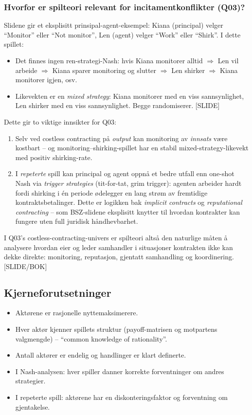 \subsubsection*{Hvorfor er spilteori relevant for incitamentkonflikter (Q03)?}

Slidene gir et eksplisitt prinsipal-agent-eksempel: Kiana (principal) velger ``Monitor'' eller ``Not monitor'', Len (agent) velger ``Work'' eller ``Shirk''. I dette spillet:
\begin{itemize}
\item Det finnes ingen ren-strategi-Nash: hvis Kiana monitorer alltid $\Rightarrow$ Len vil arbeide $\Rightarrow$ Kiana sparer monitoring og slutter $\Rightarrow$ Len shirker $\Rightarrow$ Kiana monitorer igjen, osv.
\item Likevekten er en \emph{mixed strategy}: Kiana monitorer med en viss sannsynlighet, Len shirker med en viss sannsynlighet. Begge randomiserer. [SLIDE]
\end{itemize}
Dette gir to viktige innsikter for Q03:
\begin{enumerate}
\item Selv ved costless contracting på \emph{output} kan monitoring av \emph{innsats} være kostbart -- og monitoring--shirking-spillet har en stabil mixed-strategy-likevekt med positiv shirking-rate.
\item I \emph{repeterte} spill kan principal og agent oppnå et bedre utfall enn one-shot Nash via \emph{trigger strategies} (tit-for-tat, grim trigger): agenten arbeider hardt fordi shirking i én periode ødelegger en lang strøm av fremtidige kontraktsbetalinger. Dette er logikken bak \emph{implicit contracts} og \emph{reputational contracting} -- som BSZ-slidene eksplisitt knytter til hvordan kontrakter kan fungere uten full juridisk håndhevbarhet.
\end{enumerate}

I Q03's costless-contracting-univers er spilteori altså den naturlige måten å analysere hvordan eier og leder samhandler i situasjoner kontrakten ikke kan dekke direkte: monitoring, reputasjon, gjentatt samhandling og koordinering. [SLIDE/BOK]

\subsection*{Kjerneforutsetninger}
\begin{itemize}
\item Aktørene er rasjonelle nyttemaksimerere.
\item Hver aktør kjenner spillets struktur (payoff-matrisen og motpartens valg\-mengde) -- ``common knowledge of rationality''.
\item Antall aktører er endelig og handlinger er klart definerte.
\item I Nash-analysen: hver spiller danner korrekte forventninger om andres strategier.
\item I repeterte spill: aktørene har en diskonteringsfaktor og forventning om gjentakelse.
\end{itemize}

